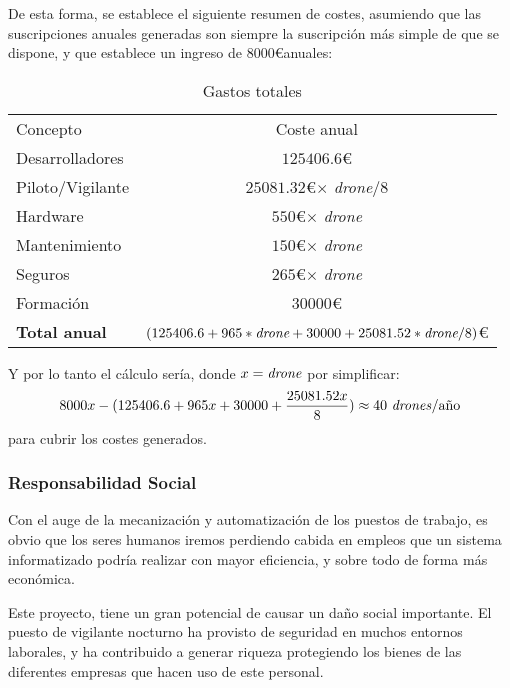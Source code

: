 De esta forma, se establece el siguiente resumen de costes, asumiendo que las suscripciones anuales generadas son siempre la suscripción más simple de que se dispone, y que establece un ingreso de $8000$\euro anuales: 

\begin{table}[H]
	\begin{center}
		\begin{tabular}{l | c}\hline
			\toprule
			Concepto & Coste anual\\
			\otoprule
			Desarrolladores & $125406.6$\euro\\
			Piloto/Vigilante & $25081.32$\euro $\times$ \emph{drone}/8 \\ 
			Hardware   & $550$\euro $\times$ \emph{drone}\\
			Mantenimiento & $150$\euro $\times$ \emph{drone}\\
			Seguros & $265$\euro $\times$ \emph{drone}\\
			Formación & $30000$\euro \\
			\hline
			\textbf{Total anual} & $(125406.6 + 965*\emph{drone} + 30000 + 25081.52*\emph{drone}/8) $\euro\\
			\bottomrule
		\end{tabular}
		\caption{Gastos totales}
		\label{tb:gastosTotalesEq}
	\end{center}
\end{table}

Y por lo tanto el cálculo sería, donde $x=\text{\emph{drone}}$ por simplificar: 
\begin{equation}
8000x - (125406.6 + 965x + 30000 + \frac{25081.52x}{8}) \approx 40 \text{ \emph{drones}/año}
\end{equation}
 para cubrir los costes generados.


\subsubsection{Responsabilidad Social}
\label{subsec:respSocial}
Con el auge de la mecanización y automatización de los puestos de trabajo, es obvio que los seres humanos iremos perdiendo cabida en empleos que un sistema informatizado podría realizar con mayor eficiencia, y sobre todo de forma más económica. 

Este proyecto, tiene un gran potencial de causar un daño social importante. El puesto de vigilante nocturno ha provisto de seguridad en muchos entornos laborales, y ha contribuido a generar riqueza protegiendo los bienes de las diferentes empresas que hacen uso de este personal.


